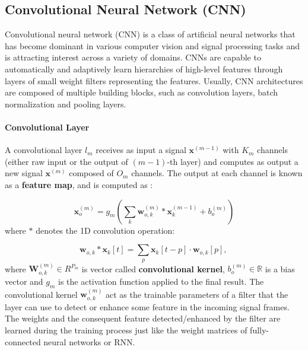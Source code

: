 \subsection{Convolutional Neural Network (CNN)}
Convolutional neural network (CNN) is a class of artificial neural networks that has become dominant in various computer vision and signal processing tasks and is attracting interest across a variety of domains.
CNNs are capable to automatically and adaptively learn hierarchies of high-level features through layers of small weight filters representing the features.
Usually, CNN architectures are composed of multiple building blocks, such as convolution layers, batch normalization and pooling layers.


\paragraph{Convolutional Layer} 
A convolutional layer $l_m$ receives as input a signal $\boldsymbol{x}^{(m-1)}$ with $K_{m}$ channels (either raw input or the output of $(m-1)$-th layer) and computes as output a new signal $\mathbf{x}^{(m)}$ composed of $O_{m}$ channels. The output at each channel is known as a \textbf{feature map}, and is computed as \cite{cnnbook}:

$$
\boldsymbol{x}_{o}^{(m)}=g_{m}\left(\sum_{k} \boldsymbol{w}_{o,k}^{(m)}* \boldsymbol{x}_{k}^{(m-1)}+b_{o}^{(m)}\right)
$$
where $*$ denotes the 1D convolution operation:

$$
\boldsymbol{w}_{o, k} * \boldsymbol{x}_{k}[t] = \sum_{p} \boldsymbol{x}_{k}[t - p] \cdot  \boldsymbol{w}_{o, k}[p] \text{, }
$$
where $\boldsymbol{W}_{o,k}^{(m)} \in R^{P_{m}}$ is vector called \textbf{convolutional kernel}, $b_{o}^{(m)} \in \mathbb{R}$ is a bias vector and $g_m$ is the activation function applied to the final result. The convolutional kernel $\boldsymbol{w}_{o, k}^{(m)}$ act as the trainable parameters of a filter that the layer can use to detect or enhance some feature in the incoming signal frames. The weights and the consequent feature detected/enhanced by the filter are learned during the training process just like the weight matrices of fully-connected neural networks or RNN.

